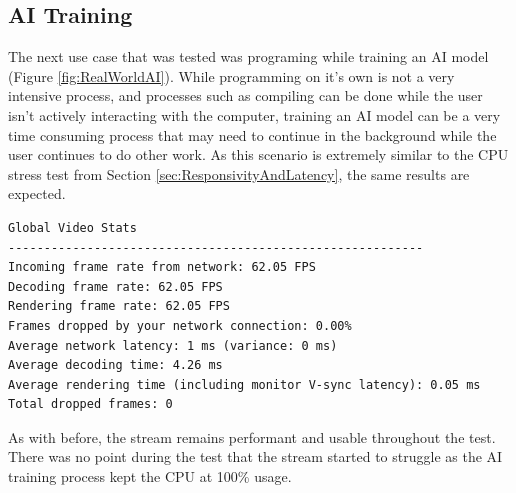 \subsection{AI Training}\label{subsec:RealWorldAI}

The next use case that was tested was programing while training an AI model (Figure \ref{fig:RealWorldAI}).
While programming on it's own is not a very intensive process, and processes such as compiling can be done while the user isn't actively interacting with the computer, training an AI model can be a very time consuming process that may need to continue in the background while the user continues to do other work.
As this scenario is extremely similar to the CPU stress test from Section \ref{sec:ResponsivityAndLatency}, the same results are expected.

\begin{lstlisting}[style=plaintext,title=Statistics recorded while training an AI (Figure \ref{fig:RealWorldAI})]
Global Video Stats
----------------------------------------------------------
Incoming frame rate from network: 62.05 FPS
Decoding frame rate: 62.05 FPS
Rendering frame rate: 62.05 FPS
Frames dropped by your network connection: 0.00%
Average network latency: 1 ms (variance: 0 ms)
Average decoding time: 4.26 ms
Average rendering time (including monitor V-sync latency): 0.05 ms
Total dropped frames: 0
\end{lstlisting}

As with before, the stream remains performant and usable throughout the test.
There was no point during the test that the stream started to struggle as the AI training process kept the CPU at 100\% usage.

